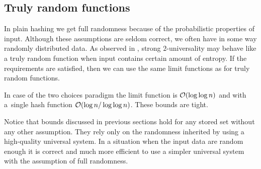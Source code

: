 \subsection{Truly random functions}
\label{subsection-truly-random-functions}
In plain hashing we get full randomness because of the probabilistic properties of input. Although these assumptions are seldom correct, we often have in some way randomly distributed data. As observed in \cite{DBLP:conf/soda/MitzenmacherV08}, strong $2$-universality may behave like a truly random function when input contains certain amount of entropy. If the requirements are satisfied, then we can use the same limit functions as for truly random functions.

In case of the two choices paradigm the limit function is $\mathcal{O}(\log \log n)$ and with a~single hash function $\mathcal{O}(\log n / \log \log n)$. These bounds are tight.

Notice that bounds discussed in previous sections hold for any stored set without any other assumption. They rely only on the randomness inherited by using a high-quality universal system. In a situation when the input data are random enough it is correct and much more efficient to use a simpler universal system with the assumption of full randomness.
